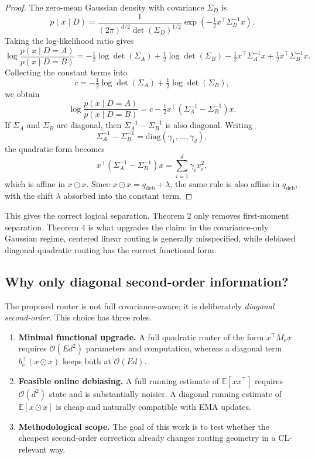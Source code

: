 \documentclass[11pt]{article}
\begin{document}
\begin{proof}
The zero-mean Gaussian density with covariance $\Sigma_D$ is
\[
p(x\mid D)
=
\frac{1}{(2\pi)^{d/2}\det(\Sigma_D)^{1/2}}
\exp\!\left(-\tfrac12 x^\top \Sigma_D^{-1}x\right).
\]
Taking the log-likelihood ratio gives
\[
\log \frac{p(x\mid D=A)}{p(x\mid D=B)}
=
-\tfrac12 \log\det(\Sigma_A)
+\tfrac12 \log\det(\Sigma_B)
-\tfrac12 x^\top \Sigma_A^{-1}x
+\tfrac12 x^\top \Sigma_B^{-1}x.
\]
Collecting the constant terms into
\[
c=-\tfrac12 \log\det(\Sigma_A)+\tfrac12 \log\det(\Sigma_B),
\]
we obtain
\[
\log \frac{p(x\mid D=A)}{p(x\mid D=B)}
=
c-\tfrac12 x^\top(\Sigma_A^{-1}-\Sigma_B^{-1})x.
\]
If $\Sigma_A$ and $\Sigma_B$ are diagonal, then $\Sigma_A^{-1}-\Sigma_B^{-1}$ is also diagonal. Writing
\[
\Sigma_A^{-1}-\Sigma_B^{-1}=\mathrm{diag}(\gamma_1,\dots,\gamma_d),
\]
the quadratic form becomes
\[
x^\top(\Sigma_A^{-1}-\Sigma_B^{-1})x
=
\sum_{i=1}^d \gamma_i x_i^2,
\]
which is affine in $x\odot x$. Since $x\odot x=q_{\mathrm{deb}}+\lambda$, the same rule is also affine in $q_{\mathrm{deb}}$, with the shift $\lambda$ absorbed into the constant term.
\end{proof}

This gives the correct logical separation. Theorem 2 only removes first-moment separation. Theorem 4 is what upgrades the claim: in the covariance-only Gaussian regime, centered linear routing is generally misspecified, while debiased diagonal quadratic routing has the correct functional form.

\subsection{Why only diagonal second-order information?}
The proposed router is not full covariance-aware; it is deliberately \emph{diagonal second-order}. This choice has three roles.
\begin{enumerate}
    \item \textbf{Minimal functional upgrade.} A full quadratic router of the form $x^\top M_e x$ requires $\mathcal O(Ed^2)$ parameters and computation, whereas a diagonal term $b_e^\top (x\odot x)$ keeps both at $\mathcal O(Ed)$.
    \item \textbf{Feasible online debiasing.} A full running estimate of $\mathbb E[xx^\top]$ requires $\mathcal O(d^2)$ state and is substantially noisier. A diagonal running estimate of $\mathbb E[x\odot x]$ is cheap and naturally compatible with EMA updates.
    \item \textbf{Methodological scope.} The goal of this work is to test whether the cheapest second-order correction already changes routing geometry in a CL-relevant way.
\end{enumerate}
\end{document}
